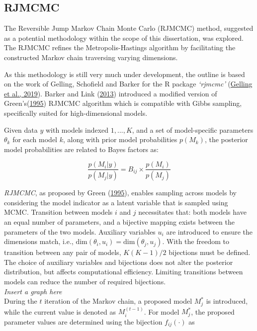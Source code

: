 \documentclass[
  11pt,
]{article}
\begin{document}
\subsection{RJMCMC}

The Reversible Jump Markov Chain Monte Carlo (RJMCMC) method, suggested
as a potential methodology within the scope of this dissertation, was
explored. The RJMCMC refines the Metropolis-Hastings algorithm by
facilitating the constructed Markov chain traversing varying dimensions.

As this methodology is still very much under development, the outline is
based on the work of Gelling, Schofield and Barker for the R package
\emph{`rjmcmc'} (\protect\hyperlink{ref-Gelling2019}{Gelling et al.,
2019}). Barker and Link (\protect\hyperlink{ref-Barker2013}{2013})
introduced a modified version of
Green's(\protect\hyperlink{ref-Green1995}{1995}) RJMCMC algorithm which
is compatible with Gibbs sampling, specifically suited for
high-dimensional models.

Given data \(y\) with models indexed \(1,...,K\), and a set of
model-specific parameters \(\theta_k\) for each model \(k\), along with
prior model probabilities \(p(M_k)\), the posterior model probabilities
are related to Bayes factors as:

\begin{equation}
\frac{p(M_i|y)}{p(M_j|y)} = B_{ij} \times \frac{p(M_i)}{p(M_j)}
\end{equation}

\emph{RJMCMC}, as proposed by Green
(\protect\hyperlink{ref-Green1995}{1995}), enables sampling across
models by considering the model indicator as a latent variable that is
sampled using MCMC. Transition between models \(i\) and \(j\)
necessitates that: both models have an equal number of parameters, and a
bijective mapping exists between the parameters of the two models.
Auxiliary variables \(u_i\) are introduced to ensure the dimensions
match, i.e., \(\text{dim}(\theta_i,u_i) = \text{dim}(\theta_j,u_j)\).
With the freedom to transition between any pair of models, \(K(K-1)/2\)
bijections must be defined. The choice of auxiliary variables and
bijections does not alter the posterior distribution, but affects
computational efficiency. Limiting transitions between models can reduce
the number of required bijections.\\
\emph{Insert a graph here}\\
During the \(t\) iteration of the Markov chain, a proposed model
\(M_{j}^*\) is introduced, while the current value is denoted as
\(M_{i}^{(t-1)}\). For model \(M_{j}^*\), the proposed parameter values
are determined using the bijection \(f_{ij}(\cdot)\) as
\end{document}
